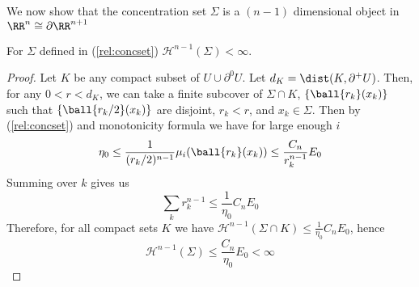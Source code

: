 We now show that the concentration set $\Sigma$ is a $(n-1)$ dimensional object in $\RR^n \cong \partial \RR^{n+1}$
\begin{lemm}
  For $\Sigma$ defined in (\ref{rel:concset})  $\mathcal{H}^{n-1}(\Sigma) < \infty$. 
\end{lemm}
\begin{proof}
    Let $K$ be any compact subset of $U \cup \partial^0 U$. Let $d_K= \dist(K, \partial^+U)$. Then, for any $0<r< d_K$, we can take a finite subcover of $\Sigma\cap K$, $\{\ball {r_k}(x_k)\}$ such that $\{\ball {r_k/2}(x_k) \}$ are disjoint, $r_k < r$, and $x_k \in \Sigma$.  Then by (\ref{rel:concset}) and monotonicity formula we have for large enough $i$
    \begin{equation}
        \eta_0 \leq \frac{1}{(r_k/2)^{n-1}} \mu_{i}(\ball {r_k}(x_k)) \leq  \frac{C_n}{r_k^{n-1}} E_0   
    \end{equation}
    Summing over $k$ gives us          
   \begin{equation*}
        \sum _{k} r_k^{n-1} \leq \frac{1}{\eta_0} C_n E_0 
    \end{equation*}
Therefore, for all compact sets $K$ we have $\mathcal{H}^{n-1}(\Sigma\cap K) \leq \frac{1}{\eta_0} C_n E_0 $, hence
$$\mathcal{H}^{n-1}(\Sigma) \leq \frac{C_n}{\eta_0}E_0 < \infty$$
\end{proof}




